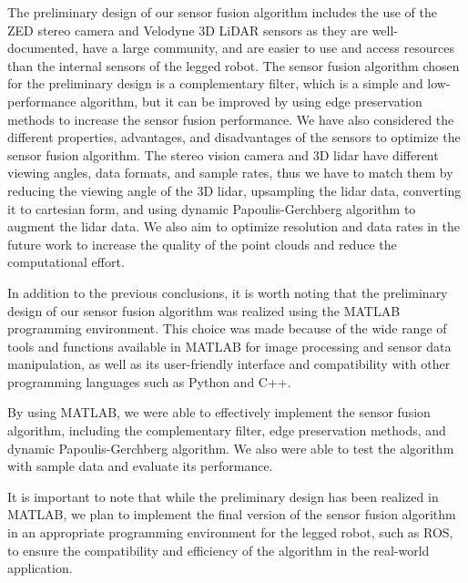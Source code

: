 \documentclass[12pt]{article}
\begin{document}
The preliminary design of our sensor fusion algorithm includes the use of the ZED stereo camera and Velodyne 3D LiDAR sensors as they are well-documented, have a large community, and are easier to use and access resources than the internal sensors of the legged robot. The sensor fusion algorithm chosen for the preliminary design is a complementary filter, which is a simple and low-performance algorithm, but it can be improved by using edge preservation methods to increase the sensor fusion performance. We have also considered the different properties, advantages, and disadvantages of the sensors to optimize the sensor fusion algorithm. The stereo vision camera and 3D lidar have different viewing angles, data formats, and sample rates, thus we have to match them by reducing the viewing angle of the 3D lidar, upsampling the lidar data, converting it to cartesian form, and using dynamic Papoulis-Gerchberg algorithm to augment the lidar data. We also aim to optimize resolution and data rates in the future work to increase the quality of the point clouds and reduce the computational effort.

In addition to the previous conclusions, it is worth noting that the preliminary design of our sensor fusion algorithm was realized using the MATLAB programming environment. This choice was made because of the wide range of tools and functions available in MATLAB for image processing and sensor data manipulation, as well as its user-friendly interface and compatibility with other programming languages such as Python and C++.

By using MATLAB, we were able to effectively implement the sensor fusion algorithm, including the complementary filter, edge preservation methods, and dynamic Papoulis-Gerchberg algorithm. We also were able to test the algorithm with sample data and evaluate its performance.

It is important to note that while the preliminary design has been realized in MATLAB, we plan to implement the final version of the sensor fusion algorithm in an appropriate programming environment for the legged robot, such as ROS, to ensure the compatibility and efficiency of the algorithm in the real-world application.



\end{document}
